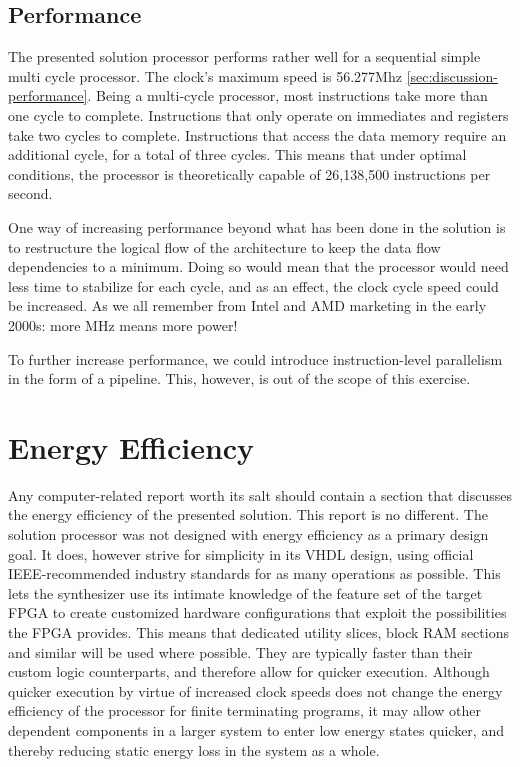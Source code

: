 \subsection{Performance}

The presented solution processor performs rather well for a sequential simple multi cycle processor.
The clock's maximum speed is 56.277Mhz \vref{sec:discussion-performance}.
Being a multi-cycle processor, most instructions take more than one cycle to complete.
Instructions that only operate on immediates and registers take two cycles to complete.
Instructions that access the data memory require an additional cycle, for a total of three cycles.
This means that under optimal conditions, the processor is theoretically capable of 26,138,500 instructions per second.

One way of increasing performance beyond what has been done in the solution is to restructure the logical flow of the architecture to keep the data flow dependencies to a minimum.
Doing so would mean that the processor would need less time to stabilize for each cycle, and as an effect, the clock cycle speed could be increased.
As we all remember from Intel and AMD marketing in the early 2000s: more MHz means more power!

To further increase performance, we could introduce instruction-level parallelism in the form of a pipeline.
This, however, is out of the scope of this exercise.

\section{Energy Efficiency}

Any computer-related report worth its salt should contain a section that discusses the energy efficiency of the presented solution.
This report is no different.
The solution processor was not designed with energy efficiency as a primary design goal.
It does, however strive for simplicity in its VHDL design, using official IEEE-recommended industry standards for as many operations as possible.
This lets the synthesizer use its intimate knowledge of the feature set of the target FPGA to create customized hardware configurations that exploit the possibilities the FPGA provides.
This means that dedicated utility slices, block RAM sections and similar will be used where possible.
They are typically faster than their custom logic counterparts, and therefore allow for quicker execution.
Although quicker execution by virtue of increased clock speeds does not change the energy efficiency of the processor for finite terminating programs, it may allow other dependent components in a larger system to enter low energy states quicker, and thereby reducing static energy loss in the system as a whole.

